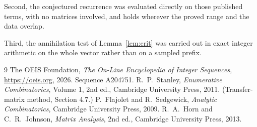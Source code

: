 \documentclass[11pt,a4paper]{article}
\theoremstyle{plain}
\theoremstyle{definition}
\begin{document}
Second, the conjectured recurrence was evaluated directly on those published terms, with no
matrices involved, and holds wherever the proved range and the data overlap.

Third, the annihilation test of Lemma~\ref{lem:crit} was carried out in exact integer
arithmetic on the whole vector rather than on a sampled prefix.

\begin{thebibliography}{9}
 The OEIS Foundation, \emph{The On-Line Encyclopedia of Integer
Sequences}, \url{https://oeis.org}, 2026. Sequence A204751.
 R.~P.~Stanley, \emph{Enumerative Combinatorics}, Volume 1, 2nd ed.,
Cambridge University Press, 2011. (Transfer-matrix method, Section 4.7.)
 P.~Flajolet and R.~Sedgewick, \emph{Analytic Combinatorics}, Cambridge
University Press, 2009.
 R.~A.~Horn and C.~R.~Johnson, \emph{Matrix Analysis}, 2nd ed., Cambridge
University Press, 2013.
\end{thebibliography}
\end{document}
